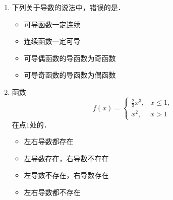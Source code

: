 \documentclass[a4paper,punct=CCT]{ctexbook}
\theoremstyle{definition}
\theoremstyle{remark}
\newif\ifshowsol
\let\leq\leqslant
\let\le\leq
\begin{document}
\begin{enumerate}
\item 下列关于导数的说法中，错误的是\uline{\hspace{10em}}．
  \begin{itemize}
    \renewcommand{\labelitemi}{\faCircleThin}
  \item 可导函数一定连续
    \ifshowsol
  \item[\faCircle]
    \else
  \item
    \fi
    连续函数一定可导
  \item 可导偶函数的导函数为奇函数
  \item 可导奇函数的导函数为偶函数
  \end{itemize}

  \ifshowsol
  下面来说明一下后两个选项．设函数\(f\)为偶函数，则
  \begin{equation*}
    \begin{split}
      f'(-x)
      &= \lim_{\fdx \to 0} \frac{\fwdf\,f(-x)}{\fdx}
      = \lim_{\fdx \to 0} \frac{\,f(\fdx-x) - \,f(-x)}{\fdx} \\
      &= \lim_{\fdx \to 0} \frac{\,f(x-\fdx) - \,f(x)}{\fdx}
      = \lim_{h \to 0} \frac{\,f(x+h) - \,f(x)}{-h} \\
      &= - \,f'(x).
    \end{split}
  \end{equation*}
  设函数\(f\)为奇函数，则
  \begin{equation*}
    \begin{split}
      f'(-x)
      &= \lim_{\fdx \to 0} \frac{\fwdf\,f(-x)}{\fdx}
      = \lim_{\fdx \to 0} \frac{\,f(\fdx-x) - \,f(-x)}{\fdx} \\
      &= \lim_{\fdx \to 0} \frac{\,f(x) - \,f(x-\fdx)}{\fdx}
      = \lim_{h \to 0} \frac{\,f(x) - \,f(x+h)}{-h} \\
      &= \,f'(x).
    \end{split}
  \end{equation*}
  \fi

\item 函数
  \begin{equation*}
    f(x) =
    \begin{cases}
      \frac23 x^3, & x \le 1, \\
      x^2, & x > 1
    \end{cases}
  \end{equation*}
  在点\(1\)处的\uline{\hspace{10em}}．
  \begin{itemize}
    \renewcommand{\labelitemi}{\faCircleThin}
  \item 左右导数都存在
    \ifshowsol
  \item[\faCircle]
    \else
  \item
    \fi
    左导数存在，右导数不存在
  \item 左导数不存在，右导数存在
  \item 左右导数都不存在
  \end{itemize}


\end{enumerate}
\end{document}
